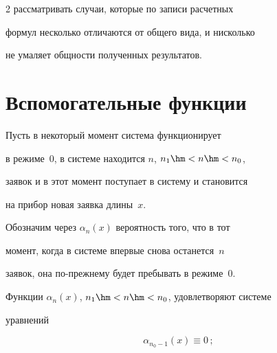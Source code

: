\begin{multicols}{2}
рассматривать случаи, которые по записи расчетных


формул несколько отличаются от общего вида, и нисколько


не умаляет общности полученных результатов.





\section{Вспомогательные функции}





Пусть в некоторый момент система функционирует


в режиме~0, в системе находится $n$, $n_1\hm<n\hm<n_0$,


заявок и в этот момент поступает в сис\-те\-му и становится


на прибор новая заявка длины~$x$.


Обозначим через $\alpha_n(x)$ вероятность того, что в тот


момент, когда в системе впервые снова останется~$n$


заявок, она по-преж\-не\-му будет пребывать в режиме~0.








Функции $\alpha_n(x)$, $n_1\hm<n\hm<n_0$, удовлетворяют системе


уравнений





\columnbreak





\noindent


\begin{equation}


\label{2.1-m}


\alpha_{n_0-1}(x) \equiv 0\,;                    


\end{equation}





\vspace*{-12pt}





\noindent


\begin{multline}



\end{multline}
\end{multicols}
